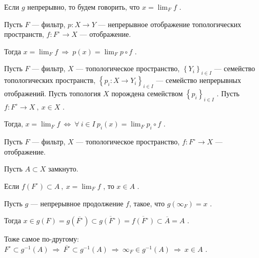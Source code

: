 Если \( g \) непрерывно, то будем говорить, что \( \displaystyle x = \lim_{F} f\) .


\SSsect Пусть \( F \) --- фильтр, \( p: X \rightarrow Y \) --- непрерывное отображение топологических пространств, \( f: F^\circ \rightarrow X \) --- отображение.

Тогда \( \displaystyle x = \lim_{F} f ~\Rightarrow~ \displaystyle p(x) = \lim_{F} p\circ f \) .

\SSsect Пусть \( F \) --- фильтр, \( X \) --- топологическое пространство, \( \left\lbrace Y_i \right\rbrace_{i \in I} \) --- семейство топологических пространств, \( \left\lbrace p_i : X \rightarrow Y_i \right\rbrace_{i \in I} \) --- семейство непрерывных отображений. 
Пусть топология \( X \) порождена семейством \( \left\lbrace p_i \right\rbrace_{i \in I} \) . 
Пусть \(  f: F^\circ \rightarrow X ~,~ x \in X \) .

Тогда, \( \displaystyle x = \lim_{F} f ~\Leftrightarrow~ \forall~i \in I~ p_i(x) = \lim_{F} p_i \circ f \) . 

\SSsect Пусть \( F \) --- фильтр, \( X \) --- топологическое пространство, 
\( f: F^\circ \rightarrow X \) --- отображение.

Пусть \( A \subset X \) замкнуто.

Если \( f\left( F^\circ \right) \subset A ~,~ \displaystyle x = \lim_{F} f \) , то \( x \in A \) .

\SSproof

Пусть \( g \) --- непрерывное продолжение \( f \), такое, что \( g(\infty_F) = x \) .

Тогда \( x \in g(F) = g(\overline{F^\circ}) \subset \overline{g(F^\circ)} = \overline{f(F^\circ)} \subset \overline{A} = A \) .

Тоже самое по-другому: \( F^\circ \subset g^{-1}(A) ~\Rightarrow~ \overline{F^\circ} \subset g^{-1}(A) ~\Rightarrow~ \infty_F \in g^{-1}(A) ~\Rightarrow~ x \in A \) . 

\SSendp


